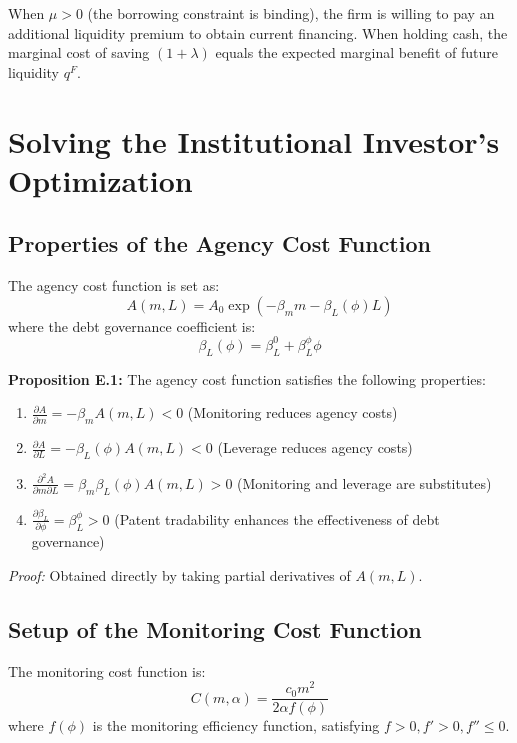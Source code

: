 \documentclass[12pt,a4paper]{article}
\begin{document}
When $\mu > 0$ (the borrowing constraint is binding), the firm is willing to pay an additional liquidity premium to obtain current financing. When holding cash, the marginal cost of saving $(1+\lambda)$ equals the expected marginal benefit of future liquidity $q^F$.

\section{Solving the Institutional Investor's Optimization}\label{app:E}

\subsection{Properties of the Agency Cost Function}
The agency cost function is set as:
\begin{equation}
A(m, L) = A_0 \exp(-\beta_m m - \beta_L(\phi)L)
\end{equation}
where the debt governance coefficient is:
\begin{equation}
\beta_L(\phi) = \beta_L^0 + \beta_L^\phi \phi
\end{equation}

\textbf{Proposition E.1:} The agency cost function satisfies the following properties:
\begin{enumerate}
    \item $\frac{\partial A}{\partial m} = -\beta_m A(m, L) < 0$ (Monitoring reduces agency costs)
    \item $\frac{\partial A}{\partial L} = -\beta_L(\phi) A(m, L) < 0$ (Leverage reduces agency costs)
    \item $\frac{\partial^2 A}{\partial m \partial L} = \beta_m \beta_L(\phi) A(m, L) > 0$ (Monitoring and leverage are substitutes)
    \item $\frac{\partial \beta_L}{\partial \phi} = \beta_L^\phi > 0$ (Patent tradability enhances the effectiveness of debt governance)
\end{enumerate}

\textit{Proof:} Obtained directly by taking partial derivatives of $A(m, L)$. 

\subsection{Setup of the Monitoring Cost Function}
The monitoring cost function is:
\begin{equation}
C(m, \alpha) = \frac{c_0 m^2}{2 \alpha f(\phi)}
\end{equation}
where $f(\phi)$ is the monitoring efficiency function, satisfying $f > 0, f' > 0, f'' \le 0$.
\end{document}
